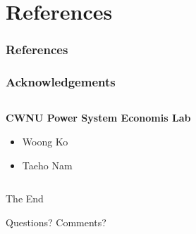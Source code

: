\documentclass[
	11pt, %
	aspectratio=169, %
]{beamer}
\begin{document}
\section{References}


\begin{frame} %
	\frametitle{References}
	
	\printbibliography
	
	
\end{frame}



\begin{frame}
	\frametitle{Acknowledgements}
	
	\begin{columns}[t] %
		\begin{column}{0.45\textwidth} %
			\textbf{CWNU Power System Economis Lab}
			\begin{itemize}
				\item Woong Ko
				\item Taeho Nam
			\end{itemize}
			
		\end{column}		
		
	\end{columns}
\end{frame}


\begin{frame}[plain] %
	\begin{center}
		{\Huge The End}
		
		\bigskip\bigskip %
		
		{\LARGE Questions? Comments?}
	\end{center}
\end{frame}

\end{document}
